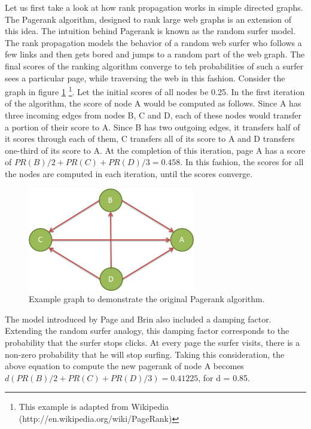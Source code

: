 Let us first take a look at how rank propagation works in simple directed graphs. The Pagerank \cite{page1999pagerank} algorithm, designed to rank large web graphs is an extension of this idea. The intuition behind Pagerank is known as the random surfer model. The rank propagation models the behavior of a random web surfer who follows a few links and then gets bored and jumps to a random part of the web graph. The final scores of the ranking algorithm converge to teh probabilities of such a surfer sees a particular page, while traversing the web in this fashion. Consider the graph in figure \ref{fig:pr-graph-example} \footnote{This example is adapted from Wikipedia (http://en.wikipedia.org/wiki/PageRank)}. Let the initial scores of all nodes be 0.25. In the first iteration of the algorithm, the score of node A would be computed as follows. Since A has three incoming edges from nodes B, C and D, each of these nodes would transfer a portion of their score to A. Since B has two outgoing edges, it transfers half of it scores through each of them, C transfers all of its score to A and D transfers one-third of its score to A. At the completion of this iteration, page A has a score of $PR(B)/2 + PR(C) + PR(D)/3 = 0.458$. In this fashion, the scores for all the nodes are computed in each iteration, until the scores converge.

\begin{figure}[t]
\centering
\includegraphics[width=0.65\textwidth]{media/chapter6/pr-example-graph.png}
\caption{Example graph to demonstrate the original Pagerank algorithm.}
\label{fig:pr-graph-example}
\end{figure}

The model introduced by Page and Brin also included a damping factor. Extending the random surfer analogy, this damping factor corresponds to the probability that the surfer stops clicks. At every page the surfer visits, there is a non-zero probability that he will stop surfing. Taking this consideration, the above equation to compute the new pagerank of node A becomes $d(PR(B)/2 + PR(C) + PR(D)/3) = 0.41225$, for d = 0.85. 


